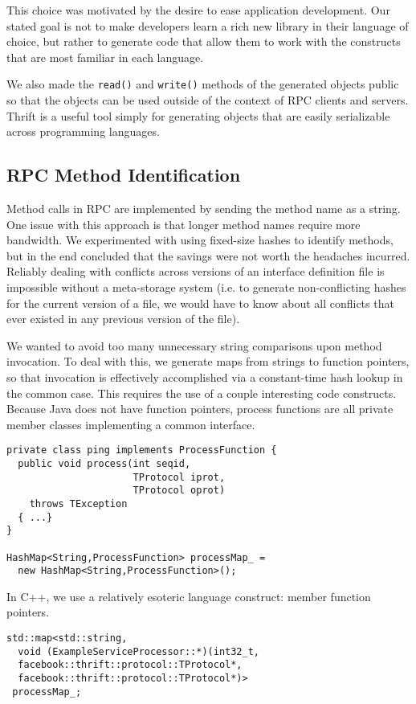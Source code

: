 \documentclass[nocopyrightspace,blockstyle]{sigplanconf}
\begin{document}
This choice was motivated by the desire to ease application development. Our stated
goal is not to make developers learn a rich new library in their language of
choice, but rather to generate code that allow them to work with the constructs
that are most familiar in each language.

We also made the \texttt{read()} and \texttt{write()} methods of the generated
objects public so that the objects can be used outside of the context
of RPC clients and servers. Thrift is a useful tool simply for generating
objects that are easily serializable across programming languages.

\subsection{RPC Method Identification}
Method calls in RPC are implemented by sending the method name as a string. One
issue with this approach is that longer method names require more bandwidth.
We experimented with using fixed-size hashes to identify methods, but in the
end concluded that the savings were not worth the headaches incurred. Reliably
dealing with conflicts across versions of an interface definition file is
impossible without a meta-storage system (i.e. to generate non-conflicting
hashes for the current version of a file, we would have to know about all
conflicts that ever existed in any previous version of the file).

We wanted to avoid too many unnecessary string comparisons upon
method invocation. To deal with this, we generate maps from strings to function
pointers, so that invocation is effectively accomplished via a constant-time
hash lookup in the common case. This requires the use of a couple interesting
code constructs. Because Java does not have function pointers, process
functions are all private member classes implementing a common interface.

\begin{verbatim}
private class ping implements ProcessFunction {
  public void process(int seqid,
                      TProtocol iprot,
                      TProtocol oprot)
    throws TException
  { ...}
}

HashMap<String,ProcessFunction> processMap_ =
  new HashMap<String,ProcessFunction>();
\end{verbatim}

In C++, we use a relatively esoteric language construct: member function
pointers.

\begin{verbatim}
std::map<std::string,
  void (ExampleServiceProcessor::*)(int32_t,
  facebook::thrift::protocol::TProtocol*,
  facebook::thrift::protocol::TProtocol*)>
 processMap_;
\end{verbatim}
\end{document}
